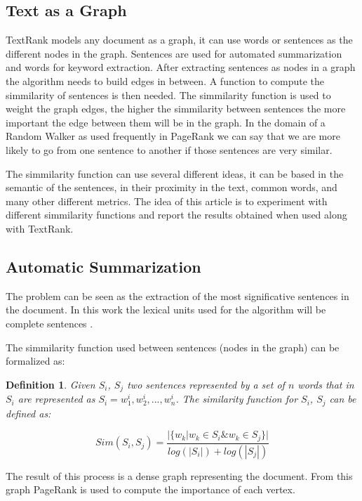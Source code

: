\documentclass{llncs}
\newtheorem{definicion}{Definition}
\begin{document}
\subsection{Text as a Graph}
TextRank models any document as a graph, it can use words or sentences as the different nodes in the graph. Sentences are used for automated summarization and words for keyword extraction. After extracting sentences as nodes in a graph the algorithm needs to build edges in between. A function to compute the simmilarity of sentences is then needed. The simmilarity function is used to weight the graph edges, the higher the simmilarity between sentences the more important the edge between them will be in the graph. In the domain of a Random Walker as used frequently in PageRank we can say that we are more likely to go from one sentence to another if those sentences are very similar. 

The simmilarity function can use several different ideas, it can be based in the semantic of the sentences, in their proximity in the text, common words, and many other different metrics. The idea of this article is to experiment with different simmilarity functions and report the results obtained when used along with TextRank.


\subsection{Automatic Summarization}
The problem can be seen as the extraction of the most significative sentences in the document. In this work the lexical units used for the algorithm will be complete sentences \cite{introductionir}.

The simmilarity function used between sentences (nodes in the graph) can be formalized as:


\begin{definicion}
Given $S_i$, $S_j$ two sentences represented by a set of $n$ words that in 
$S_i$ are represented as $S_i = w_{1}^{i}, w_{2}^{i},..., w_{n}^{i}$. The similarity function for $S_i$, $S_j$ can be defined as:


\begin{equation}
Sim(S_{i},S_{j}) = \frac{ | \{   w_{k} | w_{k} \in S_{i} \& w_{k} \in S_{j}   \}  | }    
                              {  log(|S_{i}|) + log(|S_{j}|)  }
\end{equation}


\end{definicion}

The result of this process is a dense graph representing the document. From this graph PageRank is used to compute the importance of each vertex. 
\end{document}
